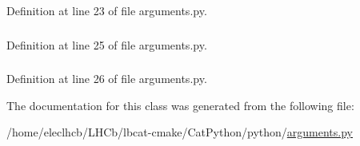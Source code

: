 Definition at line 23 of file arguments.py.\hypertarget{classarguments_1_1arguments_ae9ab26daffb9f630b9c676750cc50012}{
\subsubsection[{output}]{}}
\label{classarguments_1_1arguments_ae9ab26daffb9f630b9c676750cc50012}


Definition at line 25 of file arguments.py.\hypertarget{classarguments_1_1arguments_a57f87d0344ab2072684fd6d545d06a6a}{
\subsubsection[{shellMode}]{}}
\label{classarguments_1_1arguments_a57f87d0344ab2072684fd6d545d06a6a}


Definition at line 26 of file arguments.py.

The documentation for this class was generated from the following file:\begin{DoxyCompactItemize}
\item 
/home/eleclhcb/LHCb/lbcat-\/cmake/CatPython/python/\hyperlink{arguments_8py}{arguments.py}\end{DoxyCompactItemize}
